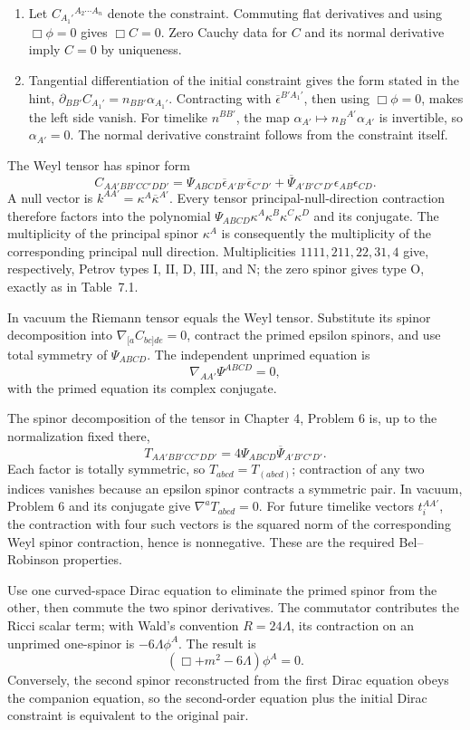 \begin{enumerate}[leftmargin=2.8em,itemsep=1.2em]
\begin{enumerate}[label=\alph*),leftmargin=2em]
\item Let \(C_{A_1'}{}^{A_2\cdots A_n}\) denote the constraint.  Commuting
flat derivatives and using \(\Box\phi=0\) gives \(\Box C=0\).  Zero Cauchy
data for \(C\) and its normal derivative imply \(C=0\) by uniqueness.

\item Tangential differentiation of the initial constraint gives the form
stated in the hint,
\(\partial_{BB'}C_{A_1'}=n_{BB'}\alpha_{A_1'}\).  Contracting with
\(\overline\epsilon^{B'A_1'}\), then using \(\Box\phi=0\), makes the left
side vanish.  For timelike \(n^{BB'}\), the map
\(\alpha_{A'}\mapsto n_B{}^{A'}\alpha_{A'}\) is invertible, so
\(\alpha_{A'}=0\).  The normal derivative constraint follows from the
constraint itself.
\end{enumerate}

The Weyl tensor has spinor form
\[
 C_{AA'BB'CC'DD'}=
 \Psi_{ABCD}\overline\epsilon_{A'B'}\overline\epsilon_{C'D'}
 +\overline\Psi_{A'B'C'D'}\epsilon_{AB}\epsilon_{CD}.
\]
A null vector is \(k^{AA'}=\kappa^A\overline\kappa^{A'}\).  Every tensor
principal-null-direction contraction therefore factors into the polynomial
\(\Psi_{ABCD}\kappa^A\kappa^B\kappa^C\kappa^D\) and its conjugate.
The multiplicity of the principal spinor \(\kappa^A\) is consequently the
multiplicity of the corresponding principal null direction.  Multiplicities
\(1111,211,22,31,4\) give, respectively, Petrov types I, II, D, III, and N;
the zero spinor gives type O, exactly as in Table~7.1.

In vacuum the Riemann tensor equals the Weyl tensor.  Substitute its spinor
decomposition into \(\nabla_{[a}C_{bc]de}=0\), contract the primed epsilon
spinors, and use total symmetry of \(\Psi_{ABCD}\).  The independent
unprimed equation is
\[
 \nabla_{AA'}\Psi^{ABCD}=0,
\]
with the primed equation its complex conjugate.

The spinor decomposition of the tensor in Chapter 4, Problem 6 is, up to the
normalization fixed there,
\[
 T_{AA'BB'CC'DD'}=4\Psi_{ABCD}
 \overline\Psi_{A'B'C'D'}.
\]
Each factor is totally symmetric, so \(T_{abcd}=T_{(abcd)}\); contraction of
any two indices vanishes because an epsilon spinor contracts a symmetric pair.
In vacuum, Problem 6 and its conjugate give \(\nabla^aT_{abcd}=0\).  For future
timelike vectors \(t_i^{AA'}\), the contraction with four such vectors is the
squared norm of the corresponding Weyl spinor contraction, hence is
nonnegative.  These are the required Bel--Robinson properties.

Use one curved-space Dirac equation to eliminate the primed spinor from the
other, then commute the two spinor derivatives.  The commutator contributes the
Ricci scalar term; with Wald's convention \(R=24\Lambda\), its contraction on an
unprimed one-spinor is \(-6\Lambda\phi^A\).  The result is
\[
 (\Box+m^2-6\Lambda)\phi^A=0.
\]
Conversely, the second spinor reconstructed from the first Dirac equation obeys
the companion equation, so the second-order equation plus the initial Dirac
constraint is equivalent to the original pair.
\end{enumerate}
